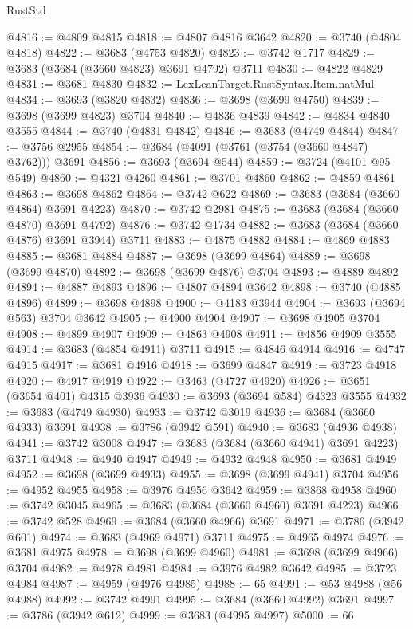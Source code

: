 \begin{lexlean}{RustStd}
\begin{coremodule}
@4816 := @4809 @4815
@4818 := @4807 @4816 @3642
@4820 := @3740 (@4804 @4818)
@4822 := @3683 (@4753 @4820)
@4823 := @3742 @1717
@4829 := @3683 (@3684 (@3660 @4823) @3691 @4792) @3711
@4830 := @4822 @4829
@4831 := @3681 @4830
@4832 := LexLeanTarget.RustSyntax.Item.natMul
@4834 := @3693 (@3820 @4832)
@4836 := @3698 (@3699 @4750)
@4839 := @3698 (@3699 @4823) @3704
@4840 := @4836 @4839
@4842 := @4834 @4840 @3555
@4844 := @3740 (@4831 @4842)
@4846 := @3683 (@4749 @4844)
@4847 := @3756 @2955
@4854 := @3684 (@4091 (@3761 (@3754 (@3660 @4847) @3762))) @3691
@4856 := @3693 (@3694 @544)
@4859 := @3724 (@4101 @95 @549)
@4860 := @4321 @4260
@4861 := @3701 @4860
@4862 := @4859 @4861
@4863 := @3698 @4862
@4864 := @3742 @622
@4869 := @3683 (@3684 (@3660 @4864) @3691 @4223)
@4870 := @3742 @2981
@4875 := @3683 (@3684 (@3660 @4870) @3691 @4792)
@4876 := @3742 @1734
@4882 := @3683 (@3684 (@3660 @4876) @3691 @3944) @3711
@4883 := @4875 @4882
@4884 := @4869 @4883
@4885 := @3681 @4884
@4887 := @3698 (@3699 @4864)
@4889 := @3698 (@3699 @4870)
@4892 := @3698 (@3699 @4876) @3704
@4893 := @4889 @4892
@4894 := @4887 @4893
@4896 := @4807 @4894 @3642
@4898 := @3740 (@4885 @4896)
@4899 := @3698 @4898
@4900 := @4183 @3944
@4904 := @3693 (@3694 @563) @3704 @3642
@4905 := @4900 @4904
@4907 := @3698 @4905 @3704
@4908 := @4899 @4907
@4909 := @4863 @4908
@4911 := @4856 @4909 @3555
@4914 := @3683 (@4854 @4911) @3711
@4915 := @4846 @4914
@4916 := @4747 @4915
@4917 := @3681 @4916
@4918 := @3699 @4847
@4919 := @3723 @4918
@4920 := @4917 @4919
@4922 := @3463 (@4727 @4920)
@4926 := @3651 (@3654 @401) @4315 @3936
@4930 := @3693 (@3694 @584) @4323 @3555
@4932 := @3683 (@4749 @4930)
@4933 := @3742 @3019
@4936 := @3684 (@3660 @4933) @3691
@4938 := @3786 (@3942 @591)
@4940 := @3683 (@4936 @4938)
@4941 := @3742 @3008
@4947 := @3683 (@3684 (@3660 @4941) @3691 @4223) @3711
@4948 := @4940 @4947
@4949 := @4932 @4948
@4950 := @3681 @4949
@4952 := @3698 (@3699 @4933)
@4955 := @3698 (@3699 @4941) @3704
@4956 := @4952 @4955
@4958 := @3976 @4956 @3642
@4959 := @3868 @4958
@4960 := @3742 @3045
@4965 := @3683 (@3684 (@3660 @4960) @3691 @4223)
@4966 := @3742 @528
@4969 := @3684 (@3660 @4966) @3691
@4971 := @3786 (@3942 @601)
@4974 := @3683 (@4969 @4971) @3711
@4975 := @4965 @4974
@4976 := @3681 @4975
@4978 := @3698 (@3699 @4960)
@4981 := @3698 (@3699 @4966) @3704
@4982 := @4978 @4981
@4984 := @3976 @4982 @3642
@4985 := @3723 @4984
@4987 := @4959 (@4976 @4985)
@4988 := 65
@4991 := @53 @4988 (@56 @4988)
@4992 := @3742 @4991
@4995 := @3684 (@3660 @4992) @3691
@4997 := @3786 (@3942 @612)
@4999 := @3683 (@4995 @4997)
@5000 := 66

\end{coremodule}
\end{lexlean}
